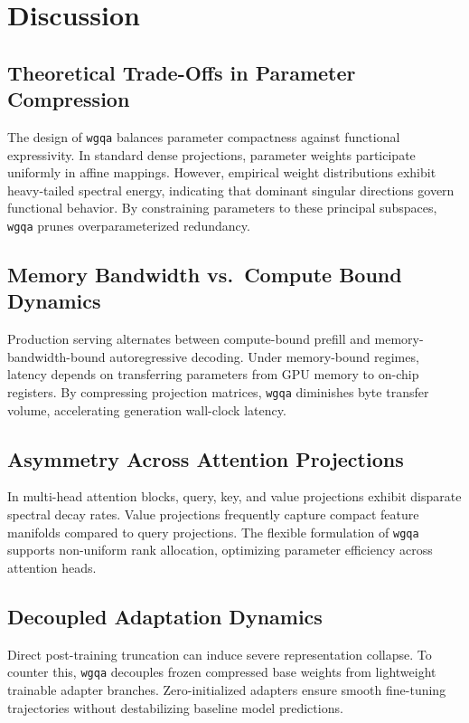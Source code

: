 \section{Discussion}

\subsection{Theoretical Trade-Offs in Parameter Compression}
The design of \texttt{wgqa} balances parameter compactness against functional expressivity. In standard dense projections, parameter weights participate uniformly in affine mappings. However, empirical weight distributions exhibit heavy-tailed spectral energy, indicating that dominant singular directions govern functional behavior. By constraining parameters to these principal subspaces, \texttt{wgqa} prunes overparameterized redundancy.

\subsection{Memory Bandwidth vs.\ Compute Bound Dynamics}
Production serving alternates between compute-bound prefill and memory-bandwidth-bound autoregressive decoding. Under memory-bound regimes, latency depends on transferring parameters from GPU memory to on-chip registers. By compressing projection matrices, \texttt{wgqa} diminishes byte transfer volume, accelerating generation wall-clock latency.

\subsection{Asymmetry Across Attention Projections}
In multi-head attention blocks, query, key, and value projections exhibit disparate spectral decay rates. Value projections frequently capture compact feature manifolds compared to query projections. The flexible formulation of \texttt{wgqa} supports non-uniform rank allocation, optimizing parameter efficiency across attention heads.

\subsection{Decoupled Adaptation Dynamics}
Direct post-training truncation can induce severe representation collapse. To counter this, \texttt{wgqa} decouples frozen compressed base weights from lightweight trainable adapter branches. Zero-initialized adapters ensure smooth fine-tuning trajectories without destabilizing baseline model predictions.

